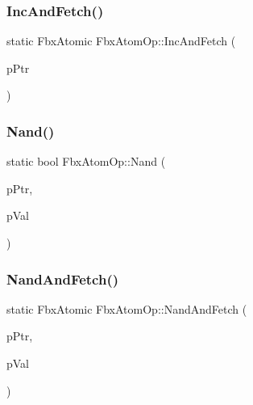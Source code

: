 \mbox{\label{class_fbx_atom_op_a520fde374ed92377de404b020363d440}} 
\subsubsection{\texorpdfstring{Inc\+And\+Fetch()}{IncAndFetch()}}
{\footnotesize\ttfamily static Fbx\+Atomic Fbx\+Atom\+Op\+::\+Inc\+And\+Fetch (\begin{DoxyParamCaption}\item[{volatile Fbx\+Atomic $\ast$}]{p\+Ptr }\end{DoxyParamCaption})\hspace{0.3cm}{\ttfamily [static]}}

\mbox{\label{class_fbx_atom_op_ae28cca443f51ae79622f9b76693f7de7}} 
\subsubsection{\texorpdfstring{Nand()}{Nand()}}
{\footnotesize\ttfamily static bool Fbx\+Atom\+Op\+::\+Nand (\begin{DoxyParamCaption}\item[{volatile Fbx\+Atomic $\ast$}]{p\+Ptr,  }\item[{Fbx\+Atomic}]{p\+Val }\end{DoxyParamCaption})\hspace{0.3cm}{\ttfamily [static]}}

\mbox{\label{class_fbx_atom_op_a8f19ff95efc360c5b404e780182c9c66}} 
\subsubsection{\texorpdfstring{Nand\+And\+Fetch()}{NandAndFetch()}}
{\footnotesize\ttfamily static Fbx\+Atomic Fbx\+Atom\+Op\+::\+Nand\+And\+Fetch (\begin{DoxyParamCaption}\item[{volatile Fbx\+Atomic $\ast$}]{p\+Ptr,  }\item[{Fbx\+Atomic}]{p\+Val }\end{DoxyParamCaption})\hspace{0.3cm}{\ttfamily [static]}}

